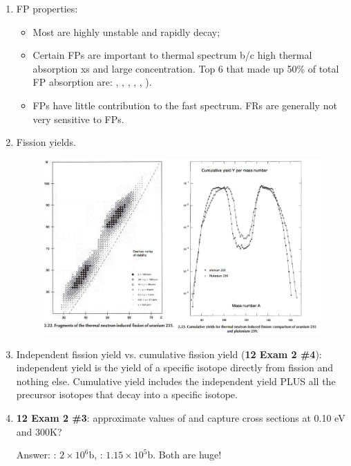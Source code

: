 \documentclass{school-22.211-notes}
\begin{document}
\clearpage
{}
\begin{enumerate}
\item FP properties: 
  \begin{itemize}
  \item Most are highly unstable and rapidly decay; 
  \item Certain FPs are important to thermal spectrum b/c high thermal absorption xs and large concentration. Top 6 that made up 50\% of total FP absorption are: , , , , , ). 
  \item FPs have little contribution to the fast spectrum. FRs are generally not very sensitive to FPs. 
  \end{itemize}

\item Fission yields. 
\begin{figure}[ht]
  \centering
  \includegraphics[width=5in]{images/dfs/fission-product-yield.png}
\end{figure}

\item Independent fission yield vs. cumulative fission yield (\textbf{12 Exam 2 \#4}): independent yield is the yield of a specific isotope directly from fission and nothing else. Cumulative yield includes the independent yield PLUS all the precursor isotopes that decay into a specific isotope. 

\item \textbf{12 Exam 2 \#3}: approximate values of  and  capture cross sections at 0.10 eV and 300K? 

Answer: : $2 \times 10^6$b,  : $1.15 \times 10^5$b. Both are huge! 
  

\end{enumerate}
\end{document}
